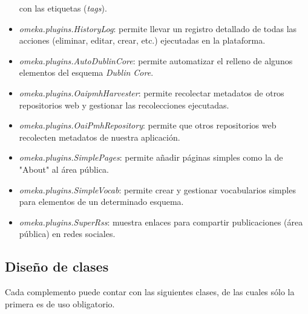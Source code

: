 \documentclass[
]{article}
\begin{document}
\begin{itemize}
  con las etiquetas (\emph{tags}).
\item
  \emph{omeka.plugins.HistoryLog}: permite llevar un registro detallado
  de todas las acciones (eliminar, editar, crear, etc.) ejecutadas en la
  plataforma.
\item
  \emph{omeka.plugins.AutoDublinCore}: permite automatizar el relleno de
  algunos elementos del esquema \emph{Dublin Core}.
\item
  \emph{omeka.plugins.OaipmhHarvester}: permite recolectar metadatos de
  otros repositorios web y gestionar las recolecciones ejecutadas.
\item
  \emph{omeka.plugins.OaiPmhRepository}: permite que otros repositorios
  web recolecten metadatos de nuestra aplicación.
\item
  \emph{omeka.plugins.SimplePages}: permite añadir páginas simples como
  la de "About" al área pública.
\item
  \emph{omeka.plugins.SimpleVocab}: permite crear y gestionar
  vocabularios simples para elementos de un determinado esquema.
\item
  \emph{omeka.plugins.SuperRss}: muestra enlaces para compartir
  publicaciones (área pública) en redes sociales.
\end{itemize}

\hypertarget{diseuxf1o-de-clases}{%
\subsection{Diseño de clases}\label{diseuxf1o-de-clases}}

Cada complemento puede contar con las siguientes clases, de las cuales
sólo la primera es de uso obligatorio.
\end{document}
